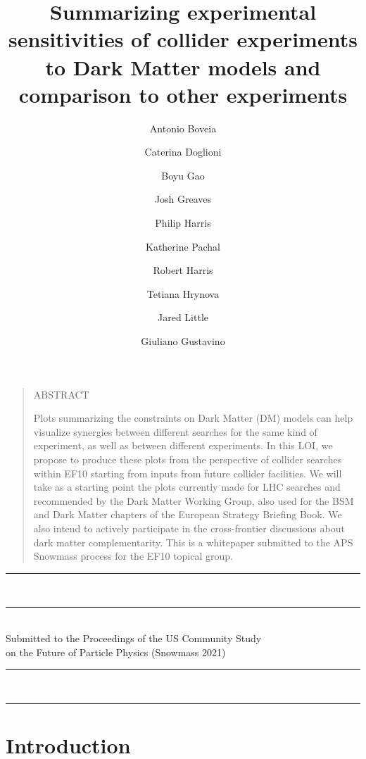 \documentclass[11pt]{article}
\title{Summarizing experimental sensitivities of collider experiments to Dark Matter models and comparison to other experiments}
\author[1]{Antonio Boveia}
\affil[1]{The Ohio State University}
\author[2,3]{Caterina Doglioni}
\affil[2]{University of Manchester}
\affil[3]{Lund University}
\author[4]{Boyu Gao}
\affil[4]{Duke University}
\author[3]{Josh Greaves}
\author[5]{Philip Harris}
\affil[5]{MIT}
\author[6]{Katherine Pachal}
\affil[6]{TRIUMF}
\author[6]{Robert Harris}
\affil[6]{Fermi National Accelerator Laboratory}
\author[7]{Tetiana Hrynova}
\affil[7]{LAPP Annecy}
\author[7]{Jared Little}
\author[8]{Giuliano Gustavino}
\affil[8]{CERN}
\newcommand\pubnumber{Preprint Number Goes Here?}
\newcommand\pubdate{\today}
\def\Title#1{\begin{center} {\LARGE #1 } \end{center}}
\def\Address#1{\begin{center}{ \it #1} \end{center}}
\newcommand\pubblock{\rightline{\begin{tabular}{l} \pubnumber\\
         \pubdate \end{tabular}}}
\newenvironment{Abstract}{\begin{quotation} \begin{center}
                       ABSTRACT
     \end{center}\bigskip  }{\end{quotation}}
\newcommand\snowmass{\begin{center}\rule[-0.2in]{\hsize}{0.01in}\\\rule{\hsize}{0.01in}\\
\vskip 0.1in Submitted to the  Proceedings of the US Community Study\\ 
on the Future of Particle Physics (Snowmass 2021)\\ 
\rule{\hsize}{0.01in}\\\rule[+0.2in]{\hsize}{0.01in} \end{center}}
\begin{document}



\maketitle




\medskip

 \begin{Abstract}
\noindent Plots summarizing the constraints on Dark Matter (DM) models can help visualize synergies between different searches for the same kind of experiment, as well as between different experiments. 
In this LOI, we propose to produce these plots from the perspective of collider searches within EF10 starting from inputs from future collider facilities. We will take as a starting point the plots currently made for LHC searches and recommended by the Dark Matter Working Group, also used for the BSM and Dark Matter chapters of the European Strategy Briefing Book. We also intend to actively participate in the cross-frontier discussions about dark matter complementarity. This is a whitepaper submitted to the APS Snowmass process for the EF10 topical group. 
\end{Abstract}


\snowmass

\def\thefootnote{\fnsymbol{footnote}}
\setcounter{footnote}{0}
%

\section{Introduction}
\end{document}

